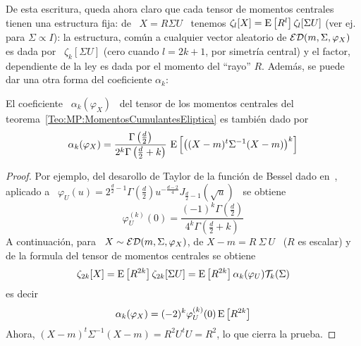 De  esta escritura,  queda ahora  claro que  cada tensor  de  momentos centrales
tienen  una estructura  fija: de  \ $X  = R  \Sigma U$  \ tenemos  $\zeta_l[X] =
\operatorname{E}\left[  R^l \right]  \zeta_l[\Sigma  U]$ (ver  ej.~\cite[teo.~2.8]{FanKot90}
para $\Sigma \propto I$): la estructura, com\'un a cualquier vector aleatorio de
$\mathcal{ED}(m,\Sigma,\varphi_X)$ es dada por \  $\zeta_k[\Sigma U]$ (cero cuando $l = 2
k + 1$, por  simetr\'ia central) y el factor, dependiente de  la ley es dada por
el  momento  del ``rayo''  $R$.   Adem\'as,  se puede  dar  una  otra forma  del
coeficiente $\alpha_k$:
%
\begin{lema}\label{Lem:MP:AlphaConR}
  El coeficiente \ $\alpha_k(\varphi_X)$ \  del tensor de los momentos centrales
  del teorema~\ref{Teo:MP:MomentosCumulantesEliptica} es tambi\'en dado por
  \[
  \alpha_k(\varphi_X) = \frac{\Gamma\left( \frac{d}{2} \right)}{2^k \Gamma\left(
      \frac{d}{2}  + k\right)}  \, \operatorname{E}\left[  \left( (X-m)^t  \Sigma^{-1} (X-m)
    \right)^k \right]
  \]
\end{lema}
%
\begin{proof}
  Por  ejemplo,  del  desarollo  de  Taylor  de  la  funci\'on  de  Bessel  dado
  en~\cite{GraRyz15},   aplicado   a   \   $\varphi_U(u)   =   2^{\frac{d}{2}-1}
  \Gamma\left(  \frac{d}{2} \right) u^{-\frac{d-2}{4}}  J_{\frac{d}{2}-1} \left(
    \sqrt{u} \right)$ \ se obtiene
  \[
  \varphi_U^{(k)}(0)   =  \frac{(-1)^k   \Gamma\left(   \frac{d}{2}  \right)}{4^k
  \Gamma\left( \frac{d}{2} + k\right)}
  \]
  A  continuaci\'on, para  \ $X  \sim \mathcal{ED}(m,\Sigma,\varphi_X)$,  de $X-m  =  R \
  \Sigma  \ U$  \  ($R$ es  escalar)  y de  la formula  del  tensor de  momentos
  centrales se obtiene
  \[
  \zeta_{2    k}[X]     =    \operatorname{E}\left[    R^{2     k}    \right]
  \zeta_{2   k}[\Sigma   U]   =   \operatorname{E}\left[  R^{2   k}   \right]
  \alpha_k(\varphi_U) \mathcal{T}_k(\Sigma)
  \]
  es decir
  \[
  \alpha_k(\varphi_X) = (-2)^k \varphi_U^{(k)}(0) \operatorname{E}\left[ R^{2 k} \right]
  \]
  Ahora, $(X-m)^t \Sigma^{-1} (X-m) = R^2 U^t U = R^2$, lo que cierra la prueba.
\end{proof}

